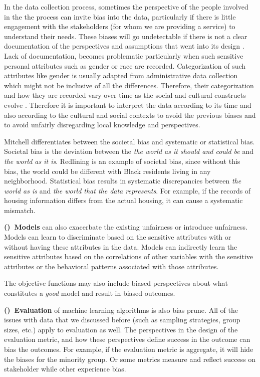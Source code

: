         In the data collection process, sometimes the perspective of the people involved in the the process  can invite bias into the data, particularly if there is little engagement with the stakeholders (for whom we are providing a service) to understand their needs. These biases will go undetectable if there is not a clear documentation of the perspectives and assumptions that went into its design \cite{Hutchinson2021Account}. 
        Lack of documentation, becomes problematic particularly when such sensitive personal attributes such as gender or race are recorded. Categorization of such attributes like gender is usually adapted from administrative data collection which might not be inclusive of all the differences. Therefore, their categorization and how they are recorded vary over time as the social and cultural constructs evolve \cite{Hanna2020CriticalRace}. Therefore it is important to interpret the data according to its time and also according to the cultural and social contexts to avoid the previous biases and to avoid unfairly disregarding local knowledge and perspectives.
        
        Mitchell \cite{mitchell2021algorithmic} differentiates between the societal bias and systematic or statistical bias. Societal bias is the deviation between the \textit{the world as it should and could be} and \textit{the world as it is}. Redlining is an example of societal bias, since without this bias, the world could be different with Black residents living in any neighborhood. Statistical bias results in systematic discrepancies between \textit{the world as is} and \textit{the world that the data represents}. For example, if the records of housing information differs from the actual housing, it can cause a systematic mismatch.
        
        \textbf{()~Models} can also exacerbate the existing unfairness or introduce unfairness. Models can learn to discriminate based on the sensitive attributes with or without having these attributes in the data. Models can indirectly learn the sensitive attributes based on the correlations of other variables with the sensitive attributes or the behavioral patterns associated with those attributes.
        
        The objective functions may also include biased perspectives about what constitutes a \textit{good} model and result in biased outcomes.
        
        \textbf{()~Evaluation} of machine learning algorithms is also bias prune. All of the issues with data that we discussed before (such as sampling strategies, group sizes, etc.) apply to evaluation as well. The perspectives in the design of the evaluation metric, and how these perspectives define success in the outcome can bias the outcomes. For example, if the evaluation metric is aggregate, it will hide the biases for the minority group. Or some metrics measure and reflect success on stakeholder while other experience bias. 
        
